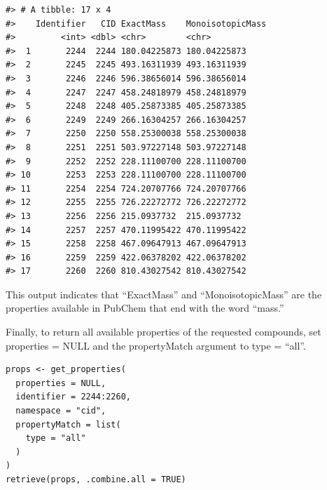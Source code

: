 \begin{verbatim}
#> # A tibble: 17 x 4
#>    Identifier   CID ExactMass    MonoisotopicMass
#>         <int> <dbl> <chr>        <chr>           
#>  1       2244  2244 180.04225873 180.04225873    
#>  2       2245  2245 493.16311939 493.16311939    
#>  3       2246  2246 596.38656014 596.38656014    
#>  4       2247  2247 458.24818979 458.24818979    
#>  5       2248  2248 405.25873385 405.25873385    
#>  6       2249  2249 266.16304257 266.16304257    
#>  7       2250  2250 558.25300038 558.25300038    
#>  8       2251  2251 503.97227148 503.97227148    
#>  9       2252  2252 228.11100700 228.11100700    
#> 10       2253  2253 228.11100700 228.11100700    
#> 11       2254  2254 724.20707766 724.20707766    
#> 12       2255  2255 726.22272772 726.22272772    
#> 13       2256  2256 215.0937732  215.0937732     
#> 14       2257  2257 470.11995422 470.11995422    
#> 15       2258  2258 467.09647913 467.09647913    
#> 16       2259  2259 422.06378202 422.06378202    
#> 17       2260  2260 810.43027542 810.43027542
\end{verbatim}

This output indicates that ``ExactMass'' and ``MonoisotopicMass'' are the properties available in PubChem that end with the word ``mass.''

Finally, to return all available properties of the requested compounds, set properties = NULL and the propertyMatch argument to type = ``all''.

\begin{verbatim}
props <- get_properties(
  properties = NULL,
  identifier = 2244:2260,
  namespace = "cid",
  propertyMatch = list(
    type = "all"
  )
)
retrieve(props, .combine.all = TRUE)
\end{verbatim}

